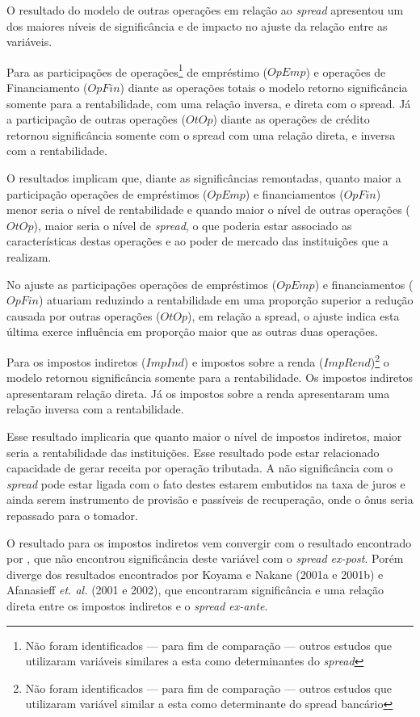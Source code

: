 \documentclass[
  12pt,
  12pt,
  openright,
  oneside,
  a4paper,
  chapter=TITLE,
  section=TITLE,
  subsection=TITLE,
  subsubsection=TITLE,
  english,
  portugues,
  sumario=tradicional]{abntex2}
\begin{document}
O resultado do modelo de outras operações em relação ao \emph{spread} apresentou um dos maiores níveis de significância e de impacto no ajuste da relação entre as variáveis.

Para as participações de operações\footnote{Não foram identificados — para fim de comparação — outros estudos que utilizaram variáveis similares a esta como determinantes do \emph{spread}} de empréstimo (\(OpEmp\)) e operações de Financiamento (\(OpFin\)) diante as operações totais o modelo retorno significância somente para a rentabilidade, com uma relação inversa, e direta com o spread. Já a participação de outras operações (\(OtOp\)) diante as operações de crédito retornou significância somente com o spread com uma relação direta, e inversa com a rentabilidade.

O resultados implicam que, diante as significâncias remontadas, quanto maior a participação operações de empréstimos (\(OpEmp\)) e financiamentos (\(OpFin\)) menor seria o nível de rentabilidade e quando maior o nível de outras operações (\(OtOp\)), maior seria o nível de \emph{spread}, o que poderia estar associado as características destas operações e ao poder de mercado das instituições que a realizam.

No ajuste as participações operações de empréstimos (\(OpEmp\)) e financiamentos (\(OpFin\)) atuariam reduzindo a rentabilidade em uma proporção superior a redução causada por outras operações (\(OtOp\)), em relação a spread, o ajuste indica esta última exerce influência em proporção maior que as outras duas operações.

Para os impostos indiretos (\(ImpInd\)) e impostos sobre a renda (\(ImpRend\))\footnote{Não foram identificados — para fim de comparação — outros estudos que utilizaram variável similar a esta como determinante do spread bancário} o modelo retornou significância somente para a rentabilidade. Os impostos indiretos apresentaram relação direta. Já os impostos sobre a renda apresentaram uma relação inversa com a rentabilidade.

Esse resultado implicaria que quanto maior o nível de impostos indiretos, maior seria a rentabilidade das instituições. Esse resultado pode estar relacionado capacidade de gerar receita por operação tributada. A não significância com o \emph{spread} pode estar ligada com o fato destes estarem embutidos na taxa de juros e ainda serem instrumento de provisão e passíveis de recuperação, onde o ônus seria repassado para o tomador.

O resultado para os impostos indiretos vem convergir com o resultado encontrado por \textcite{almeida:2013}, que não encontrou significância deste variável com o \emph{spread ex-post}. Porém diverge dos resultados encontrados por Koyama e Nakane (2001a e 2001b) e Afanasieff \emph{et. al.} (2001 e 2002), que encontraram significância e uma relação direta entre os impostos indiretos e o \emph{spread ex-ante}.
\end{document}
